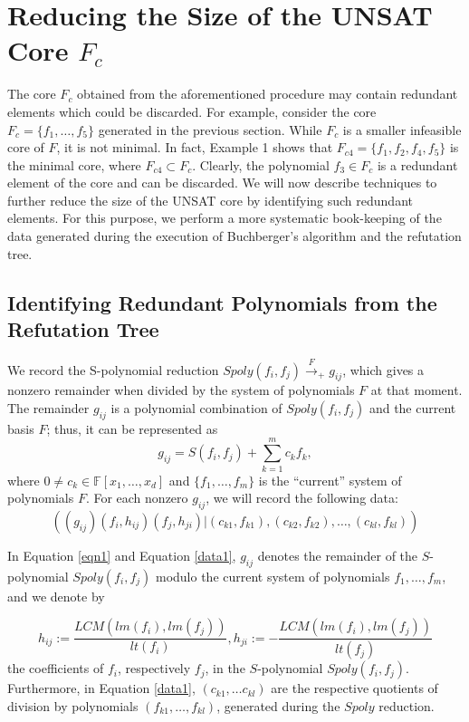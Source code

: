 \section{Reducing the Size of the UNSAT Core $F_c$}
\label{sec:alg}
The core $F_c$ obtained from the aforementioned procedure may
contain redundant elements which could be discarded. For
example, consider the core $F_c=\{f_1,\dots, f_5\}$ generated in the
previous section. While $F_c$ is a smaller infeasible core of $F$, it
is not minimal. In fact, Example 1 shows that $F_{c4} =\{f_1,f_2,f_4,f_5\}$ is the
minimal core, where $F_{c4} \subset F_{c}$. Clearly, the polynomial
$f_3 \in F_c$ is a redundant element of the core and can be 
discarded. We will now describe techniques to further reduce the size
of the UNSAT core by identifying such redundant elements. 
For this purpose, we perform a more 
systematic book-keeping of the data generated during the execution of
Buchberger's algorithm and the refutation tree. 

\subsection{Identifying Redundant Polynomials from the Refutation Tree}

We record the S-polynomial reduction
$Spoly(f_i,f_j)\xrightarrow{F}_+{g_{ij}}$, which gives a nonzero
remainder when divided by the system of polynomials $F$ at that
moment. The remainder $g_{ij}$ is a polynomial combination of
$Spoly(f_i,f_j)$ and the current basis $F$; thus, it can be
represented as
\begin{equation}
\label{eqn1}
g_{ij}= S(f_i,f_j)+\displaystyle\sum_{k=1}^m c_kf_k,
\end{equation}
where $0\neq c_k\in\mathbb{F}[x_1,\ldots,x_d]$ and
$\{f_1,\ldots,f_m\}$ is the ``current'' system of polynomials
$F$. For each nonzero $g_{ij}$, we will record the following data: 
\begin{equation}
\label{data1}
((g_{ij})(f_{i},h_{ij})(f_{j},h_{ji})| (c_{k1},f_{k1}),(c_{k2},f_{k2}),\dots,(c_{kl},f_{kl}))
\end{equation}

In Equation \ref{eqn1} and Equation \ref{data1}, $g_{ij}$ denotes the
remainder of the $S$-polynomial $Spoly(f_i,f_j)$ modulo the current system
of polynomials $f_1,\ldots,f_m$, and we denote by  

$$h_{ij}:=\displaystyle\frac{LCM(lm(f_i),lm(f_j))}{lt(f_i)},
h_{ji}:= - \displaystyle\frac{LCM(lm(f_i),lm(f_j))}{lt(f_j)}$$ 
the coefficients of $f_i$, respectively $f_j$, in the $S$-polynomial
$Spoly(f_i,f_j)$. Furthermore, in Equation \ref{data1}, $(c_{k1}, \dots
c_{kl})$ are the respective quotients of division by
polynomials $(f_{k1},\dots,f_{kl})$, generated during the $Spoly$ reduction.  

